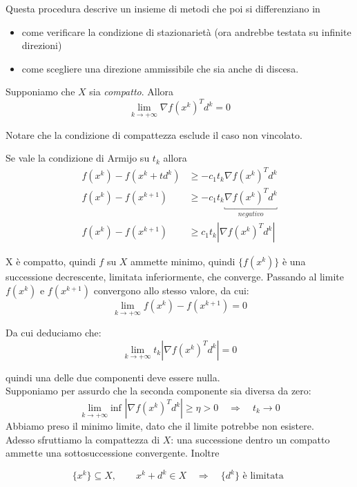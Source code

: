 Questa procedura descrive un insieme di metodi che poi si
differenziano in
\begin{itemize}
\item come verificare la condizione di stazionarietà (ora andrebbe
  testata su infinite direzioni)
\item come scegliere una direzione ammissibile che sia anche di discesa.
\end{itemize}

\begin{property}
  \label{prop:gradiente-compatto}
  Supponiamo che $X$ sia \emph{compatto}. Allora
  $$ \lim_{k \to +\infty} \nabla f(x^{k})^{T}d^{k} = 0 $$
\end{property}
Notare che la condizione di compattezza esclude il caso non vincolato.


\begin{thproof}
  Se vale la condizione di Armijo su $t_k$ allora
  \[\begin{array}{ll}
    f(x^{k}) - f(x^{k}+td^k) &\geq - c_1 t_k \nabla f(x^{k})^{T} d^{k} \\
    f(x^{k}) - f(x^{k+1})    &\geq - c_1 t_k \underbracket{\nabla f(x^{k})^{T} d^{k}}_{negativo}\\
    f(x^{k}) - f(x^{k+1})    &\geq  c_1 t_k | \nabla f(x^{k})^{T} d^{k}|
  \end{array}\]

  X \`e compatto, quindi $f$ su $X$ ammette minimo, quindi
  $\{f(x^{k})\}$ è una successione decrescente, limitata inferiormente,
  che converge. Passando al limite $f(x^k)$ e $f(x^{k+1})$ convergono
  allo stesso valore, da cui:
  $$ \lim_{k \to +\infty}f(x^{k}) - f(x^{k+1}) = 0 $$

  Da cui deduciamo che:
  $$ \lim_{k \to +\infty} t_k | \nabla f(x^{k})^{T}d^{k}| = 0 $$

  quindi una delle due componenti deve essere nulla.\\
  Supponiamo per assurdo che la seconda componente sia diversa da zero:
  $$ \lim_{k \to +\infty}\text{inf } |\nabla f(x^{k})^{T}d^{k}| \geq \eta > 0
  \quad \Rightarrow \quad t_k \to 0 $$
  Abbiamo preso il minimo limite, dato che il limite potrebbe non esistere.\\
  Adesso sfruttiamo la compattezza di $X$: una successione dentro un compatto ammette
  una sottosuccessione convergente. Inoltre
  
  $$ \{x^{k}\} \subseteq X, \qquad x^{k} + d^{k} \in X \quad
  \Rightarrow \quad 
  \{ d^{k}\} \text{ \`e limitata }$$


\end{thproof}
